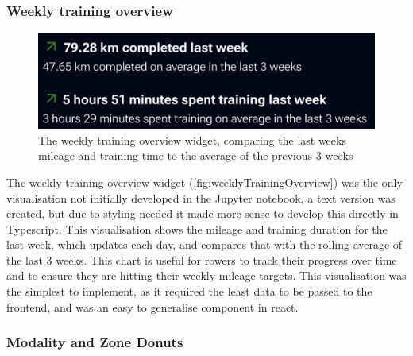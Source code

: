 \subsubsection{Weekly training overview}

\begin{figure}[htbp]

    \centering
    \includegraphics[width=0.75\linewidth]{figures/trainingOverviewWidget.png}
    \captionsetup{justification=centering}
    \caption[Weekly Training Overview]{\label{fig:weeklyTrainingOverview}The weekly training overview widget, comparing the last weeks mileage and training time to the average of the previous 3 weeks} 
\end{figure}

The weekly training overview widget (\autoref{fig:weeklyTrainingOverview}) was the only visualisation not initially developed in the Jupyter notebook, a text version was created, but due to styling needed it made more sense to develop this directly in Typescript. This visualisation shows the mileage and training duration for the last week, which updates each day, and compares that with the rolling average of the last 3 weeks. This chart is useful for rowers to track their progress over time and to ensure they are hitting their weekly mileage targets. This visualisation was the simplest to implement, as it required the least data to be passed to the frontend, and was an easy to generalise component in react.


\subsubsection{Modality and Zone Donuts}

